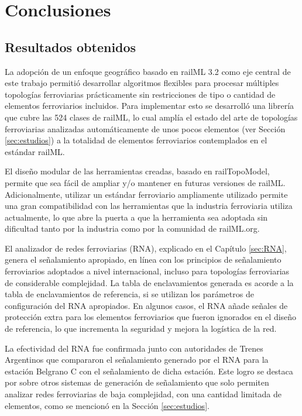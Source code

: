\chapter{Conclusiones}

\section{Resultados obtenidos}

La adopción de un enfoque geográfico basado en railML 3.2 como eje central de este trabajo permitió desarrollar algoritmos flexibles para procesar múltiples topologías ferroviarias prácticamente sin restricciones de tipo o cantidad de elementos ferroviarios incluidos. Para implementar esto se desarrolló una librería que cubre las 524 clases de railML, lo cual amplía el estado del arte de topologías ferroviarias analizadas automáticamente de unos pocos elementos (ver Sección \ref{sec:estudios}) a la totalidad de elementos ferroviarios contemplados en el estándar railML. 

El diseño modular de las herramientas creadas, basado en railTopoModel, permite que sea fácil de ampliar y/o mantener en futuras versiones de railML. Adicionalmente, utilizar un estándar ferroviario ampliamente utilizado permite una gran compatibilidad con las herramientas que la industria ferroviaria utiliza actualmente, lo que abre la puerta a que la herramienta sea adoptada sin dificultad tanto por la industria como por la comunidad de railML.org.

El analizador de redes ferroviarias (RNA), explicado en el Capítulo \ref{sec:RNA}, genera el señalamiento apropiado, en línea con los principios de señalamiento ferroviarios adoptados a nivel internacional, incluso para topologías ferroviarias de considerable complejidad. La tabla de enclavamientos generada es acorde a la tabla de enclavamientos de referencia, si se utilizan los parámetros de configuración del RNA apropiados. En algunos casos, el RNA añade señales de protección extra para los elementos ferroviarios que fueron ignorados en el diseño de referencia, lo que incrementa la seguridad y mejora la logística de la red.

La efectividad del RNA fue confirmada junto con autoridades de Trenes Argentinos que compararon el señalamiento generado por el RNA para la estación Belgrano C con el señalamiento de dicha estación. Este logro se destaca por sobre otros sistemas de generación de señalamiento que solo permiten analizar redes ferroviarias de baja complejidad, con una cantidad limitada de elementos, como se mencionó en la Sección \ref{sec:estudios}.

